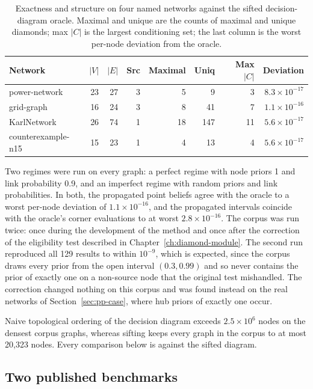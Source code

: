 \documentclass[12pt]{report}
\begin{document}
\begin{table}[htbp]
\centering
\caption{Exactness and structure on four named networks against the sifted decision-diagram
oracle. Maximal and unique are the counts of maximal and unique diamonds; max $|C|$ is the largest
conditioning set; the last column is the worst per-node deviation from the oracle.}
\label{tab:pp-structured}
\footnotesize
\renewcommand{\arraystretch}{1.15}
\begin{tabular}{@{}lrrrrrrr@{}}
\toprule
Network & $|V|$ & $|E|$ & Src & Maximal & Uniq & Max $|C|$ & Deviation \\
\midrule
power-network & 23 & 27 & 3 & 5 & 9 & 3 & $8.3\times10^{-17}$ \\
grid-graph & 16 & 24 & 3 & 8 & 41 & 7 & $1.1\times10^{-16}$ \\
KarlNetwork & 26 & 74 & 1 & 18 & 147 & 11 & $5.6\times10^{-17}$ \\
counterexample-n15 & 15 & 23 & 1 & 4 & 13 & 4 & $5.6\times10^{-17}$ \\
\bottomrule
\end{tabular}
\end{table}

Two regimes were run on every graph: a perfect regime with node priors 1 and link probability 0.9, and an imperfect regime with random priors and link probabilities. In both, the propagated point beliefs agree with the oracle to a worst per-node deviation of $1.1 \times 10^{-16}$, and the propagated intervals coincide with the oracle's corner evaluations to at worst $2.8 \times 10^{-16}$. The corpus was run twice: once during the development of the method
and once after the correction of the eligibility test described in
Chapter~\ref{ch:diamond-module}. The second run reproduced all 129 results to within
$10^{-9}$, which is expected, since the corpus draws every prior from the open interval
$(0.3, 0.99)$ and so never contains the prior of exactly one on a non-source node that the
original test mishandled. The correction changed nothing on this corpus and was found
instead on the real networks of Section~\ref{sec:pp-case}, where hub priors of exactly one
occur.

Naive topological ordering of the decision diagram exceeds $2.5 \times 10^{6}$ nodes on the
densest corpus graphs, whereas sifting keeps every graph in the corpus to at most 20,323
nodes. Every comparison below is against the sifted diagram.

\subsection{Two published benchmarks}
\label{sec:pp-repro}
\end{document}
